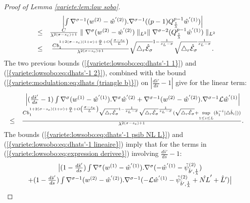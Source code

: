 \documentclass[11pt,a4paper,reqno]{amsart}
\theoremstyle{remark}
\numberwithin{equation}{section}
\begin{document}
\begin{proof}[Proof of Lemma \ref{variete:lem:low sobo}]
\begin{equation}
\begin{array}{r c l}
& \left| \int \nabla^{\sigma-1}(w^{(2)}-\hat{w}^{'(2)}).\nabla^{\sigma-1}((p-1)Q_{\frac{1}{\lambda}}^{p-1} \hat{w}^{'(1)})\right|\\
\leq & \frac{C}{\lambda^{2(\sigma-s_c)+1}}\parallel \nabla^{\sigma}(w^{(2)}-\hat{w}^{'(2)}) \parallel_{L^2}   \parallel \nabla^{\sigma-2}(Q_{\frac{1}{\lambda}}^{p-1} \hat{w}^{'(1)}) \parallel_{L^2}\\
\leq & \frac{Cb_1^{1+2(\sigma-s_c)(1+\nu)+\frac{\alpha}{L}+O\left(\frac{\sigma-s_c}{L} \right)}}{\lambda^{2(\sigma-s_c)+1}}\sqrt{\triangle _r \hat{\mathcal{E}}_{\sigma}}^{1-\frac{1}{s_L-\sigma}}  \sqrt{\triangle _r \hat{\mathcal{E}}_{\sigma}}^{\frac{1}{s_L-\sigma}}.
\end{array}
\end{equation}
The two previous bounds {{\rm (\ref{{variete:lowsobo:eq:dhats'-1 1}})}} and {{\rm (\ref{{variete:lowsobo:eq:dhats'-1 2}})}}, combined with the bound {{\rm (\ref{{variete:modulation:eq:dhats (triangle b)}})}} on $|\frac{d\hat{s}'}{ds}-1|$ give for the linear term:
\begin{equation} \label{variete:lowsobo:eq:dhats'-1 lineaire}
\begin{array}{r c l}
& \left| (\frac{d\hat{s}'}{ds}-1)\int \nabla^{\sigma}(w^{(1)}-\hat{w}^{'(1)}).\nabla^{\sigma}\hat{w}^{'(2)}  + \nabla^{\sigma-1}(w^{(2)}-\hat{w}^{'(2)}).\nabla^{\sigma-1}\mathcal{L} \hat{w}^{'(1)}\right|\\
\leq & \frac{Cb_1^{1+2(\sigma-s_c)(1+\nu)+\frac{\alpha}{L}+O\left(\frac{\sigma-s_c}{L} \right)}\sqrt{\triangle _r \hat{\mathcal{E}}_{\sigma}}^{1-\frac{1}{s_L-\sigma}}  \sqrt{\triangle _r \hat{\mathcal{E}}_{\sigma}}^{\frac{1}{s_L-\sigma}}( \sqrt{\triangle _r \hat{\mathcal{E}}_{\sigma}}+\underset{1\leq i \leq L}{\text{sup}}(b_1^{-i}|\triangle \hat{b}_i|))}{\lambda^{2(\sigma-s_c)+1}}.
\end{array}
\end{equation}
The bounds {{\rm (\ref{{variete:lowsobo:eq:dhats'-1 psib NL L}})}} and {{\rm (\ref{{variete:lowsobo:eq:dhats'-1 lineaire}})}} imply that for the terms in {{\rm (\ref{{variete:lowsobo:eq:expression derivee}})}} involving $\frac{d\hat{s}'}{ds}-1$:
\begin{equation} \label{variete:lowsobo:eq:estimation dhats'-1}
\begin{array}{r c l}
&\bigl{|} (1-\frac{d\hat{s}'}{ds})\int \nabla^{\sigma}(w^{(1)}-\hat{w}^{'(1)}).\nabla^{\sigma}(-\hat{w}^{'(1)}-\tilde{\psi}_{\hat{b}',\frac{1}{\lambda}}^{(2)}) \\
& + (1-\frac{d\hat{s}'}{ds})\int \nabla^{\sigma-1}(w^{(2)}-\hat{w}^{'(2)}).\nabla^{\sigma-1}(-\mathcal{L}\hat{w}^{'(1)}-\tilde{\psi}_{\hat{b}',\frac{1}{\lambda}}^{(2)}+\hat{NL}'+\hat{L}' )\bigr{|}\\

\end{array}
\end{equation}
\end{proof}
\end{document}
